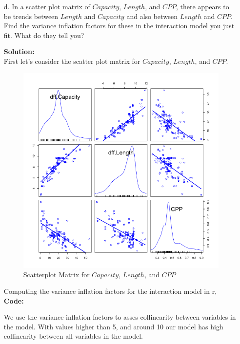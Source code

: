 \documentclass[12pt]{article}
\makeatletter
\theoremstyle{homework}
\newenvironment{exercise}[1]
{\def\@currentlabel{#1}\exercisecore}
{\endexercisecore}
\newcommand{\localhead}[1]{\par\smallskip\noindent\textbf{#1}\nobreak\\}%
\newcommand\solution{\localhead{Solution:}}
\makeatother
\begin{document}
\begin{exercise}{3.}
\begin{enumerate}
    \item[d.] In a scatter plot matrix of $Capacity$, $Length$, and $CPP$, there appears to be trends between $Length$ and 
    $Capacity$ and also between $Length$ and $CPP$. Find the variance inflation factors for these in the interaction model you just fit.
    What do they tell you?\\
    \solution First let's consider the scatter plot matrix for $Capacity$, $Length$, and $CPP$.
    \begin{figure}[H]
      \begin{center}
      \caption{Scatterplot Matrix for $Capacity$, $Length$, and $CPP$ }
      \includegraphics[width = .9\textwidth]{Rplot02.png}
      \end{center}
    \end{figure}
    Computing the variance inflation factors for the interaction model in r,\\ 
    \textbf{Code:}
    \begin{center}
    
    \end{center}
    We use the variance inflation factors to asses collinearity between variables in the model. With values higher than 5, and around 10 our model has 
    high collinearity between all variables in the model. 



  \end{enumerate}
   
 \end{exercise}
\end{document}
